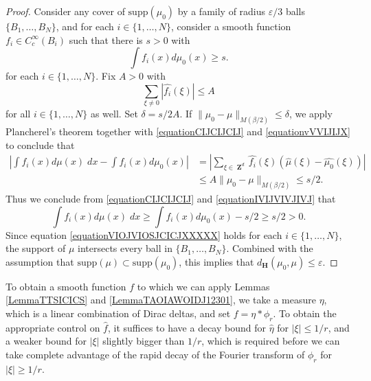\documentclass[dvipsnames,letterpaper,12pt]{article}
\numberwithin{equation}{section}
\DeclareMathOperator{\ZZ}{\mathbf{Z}}
\numberwithin{theorem}{section}
\begin{document}
\begin{proof}
    Consider any cover of $\text{supp}(\mu_0)$ by a family of radius $\varepsilon/3$ balls $\{ B_1,\dots,B_N \}$, and for each $i \in \{ 1, \dots, N \}$, consider a smooth function $f_i \in C_c^\infty(B_i)$ such that there is $s > 0$ with
    \begin{equation} \label{equationCIJCIJCIJ}
        \int f_i(x) d\mu_0(x) \geq s.
    \end{equation}
    for each $i \in \{ 1, \dots, N \}$. Fix $A > 0$ with
    \begin{equation} \label{equationvVVIJIJX}
        \sum_{\xi \neq 0} |\widehat{f_i}(\xi)| \leq A
    \end{equation}
    for all $i \in \{ 1, \dots, N \}$ as well. Set $\delta = s/2A$. If $\| \mu_0 - \mu \|_{M(\beta/2)} \leq \delta$, we apply Plancherel's theorem together with \eqref{equationCIJCIJCIJ} and \eqref{equationvVVIJIJX} to conclude that
    \begin{equation} \label{equationIVIJVIVJIVJ}
    \begin{split}
        \left| \int f_i(x) d\mu(x)\; dx - \int f_i(x) d\mu_0(x) \right| &= \left| \sum_{\xi \in \ZZ^d} \widehat{f_i}(\xi) \left( \widehat{\mu}(\xi) - \widehat{\mu_0}(\xi) \right) \right|\\
        &\leq A \| \mu_0 - \mu \|_{M(\beta/2)} \leq s/2.
    \end{split}
    \end{equation}
    Thus we conclude from \eqref{equationCIJCIJCIJ} and \eqref{equationIVIJVIVJIVJ} that
    \begin{equation} \label{equationVIOJVIOSJCICJXXXXX}
        \int f_i(x) d\mu(x)\; dx \geq \int f_i(x) d\mu_0(x) - s/2 \geq s/2 > 0.
    \end{equation}
    Since equation \eqref{equationVIOJVIOSJCICJXXXXX} holds for each $i \in \{ 1,\dots, N \}$, the support of $\mu$ intersects every ball in $\{ B_1, \dots, B_N \}$. Combined with the assumption that $\text{supp}(\mu) \subset \text{supp}(\mu_0)$, this implies that $d_\mathbf{H}(\mu_0,\mu) \leq \varepsilon$.
\end{proof}

To obtain a smooth function $f$ to which we can apply Lemmas \ref{LemmaTTSICICS} and \ref{LemmaTAOIAWOIDJ12301}, we take a measure $\eta$, which is a linear combination of Dirac deltas, and set $f = \eta * \phi_r$. To obtain the appropriate control on $\widehat{f}$, it suffices to have a decay bound for $\widehat{\eta}$ for $|\xi| \leq 1/r$, and a weaker bound for $|\xi|$ slightly bigger than $1/r$, which is required before we can take complete advantage of the rapid decay of the Fourier transform of $\phi_r$ for $|\xi| \geq 1/r$.
\end{document}
